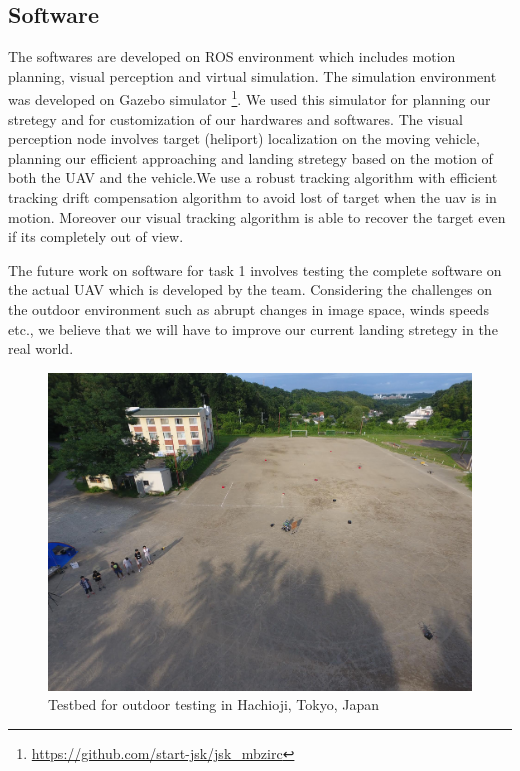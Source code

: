 \documentclass{standalone}
\begin{document}
\subsection{Software}

The softwares are developed on ROS environment which includes motion planning, visual perception and virtual simulation. The simulation environment was developed on Gazebo simulator \footnote{\url{https://github.com/start-jsk/jsk_mbzirc}}. We used this simulator for planning our stretegy and for customization of our hardwares and softwares. The visual perception node involves target (heliport) localization on the moving vehicle, planning our efficient approaching and landing stretegy based on the motion of both the UAV and the vehicle.We use a robust tracking algorithm with efficient tracking drift compensation algorithm to avoid lost of target when the uav is in motion. Moreover our visual tracking algorithm is able to recover the target even if its completely out of view. 

The future work on software for task 1 involves testing the complete software on the actual UAV which is developed by the team. Considering the challenges on the outdoor environment such as abrupt changes in image space, winds speeds etc., we believe that we will have to improve our current landing stretegy in the real world. 

\begin{figure}
  \includegraphics[width=\columnwidth, trim={2cm 5cm 3cm 7cm},clip]{sections/task1/images/testbed}
  \caption{Testbed for outdoor testing in Hachioji, Tokyo, Japan}
\end{figure}
\end{document}
